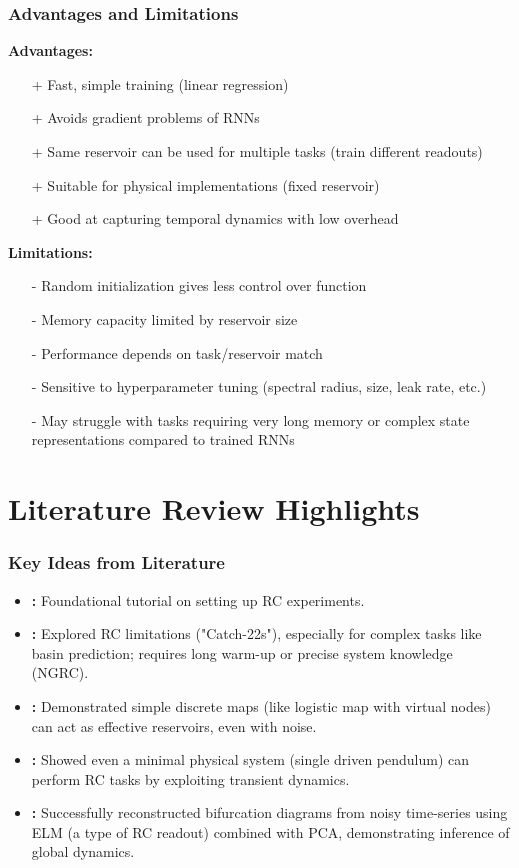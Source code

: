 \documentclass{beamer}
\begin{document}
\begin{frame}
    \frametitle{Advantages and Limitations}
    \textbf{Advantages:}
    \begin{itemize}
        \item [+] Fast, simple training (linear regression)
        \item [+] Avoids gradient problems of RNNs
        \item [+] Same reservoir can be used for multiple tasks (train different readouts)
        \item [+] Suitable for physical implementations (fixed reservoir)
        \item [+] Good at capturing temporal dynamics with low overhead
    \end{itemize}
    \pause
    \textbf{Limitations:}
    \begin{itemize}
        \item [-] Random initialization gives less control over function
        \item [-] Memory capacity limited by reservoir size
        \item [-] Performance depends on task/reservoir match \cite{article_RC_intro}
        \item [-] Sensitive to hyperparameter tuning (spectral radius, size, leak rate, etc.)
        \item [-] May struggle with tasks requiring very long memory or complex state representations compared to trained RNNs \cite{article_catch_22s_rc}
    \end{itemize}
\end{frame}

\section{Literature Review Highlights}

\begin{frame}
    \frametitle{Key Ideas from Literature}
    \begin{itemize}
        \item \textbf{\cite{article_RC_intro}:} Foundational tutorial on setting up RC experiments.
        \pause
        \item \textbf{\cite{article_catch_22s_rc}:} Explored RC limitations ("Catch-22s"), especially for complex tasks like basin prediction; requires long warm-up or precise system knowledge (NGRC).
        \pause
        \item \textbf{\cite{Arun2024}:} Demonstrated simple discrete maps (like logistic map with virtual nodes) can act as effective reservoirs, even with noise.
        \pause
        \item \textbf{\cite{Mandal2022}:} Showed even a minimal physical system (single driven pendulum) can perform RC tasks by exploiting transient dynamics.
        \pause
        \item \textbf{\cite{Itoh2020}:} Successfully reconstructed bifurcation diagrams from noisy time-series using ELM (a type of RC readout) combined with PCA, demonstrating inference of global dynamics.
    \end{itemize}
\end{frame}
\end{document}
